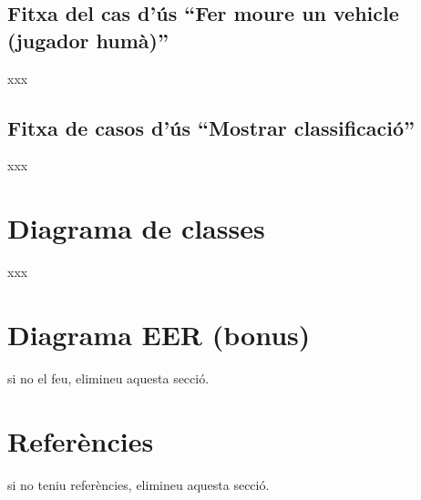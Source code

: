 \documentclass[12pt,a4paper]{article}
\begin{document}
\subsection{Fitxa del cas d'ús ``Fer moure un vehicle (jugador humà)''}
xxx

\subsection{Fitxa de casos d'ús ``Mostrar classificació''}
xxx

\section{Diagrama de classes}
xxx

\section{Diagrama EER (bonus)}
si no el feu, elimineu aquesta secció.

\section*{Referències}
si no teniu referències, elimineu aquesta secció.
\end{document}
